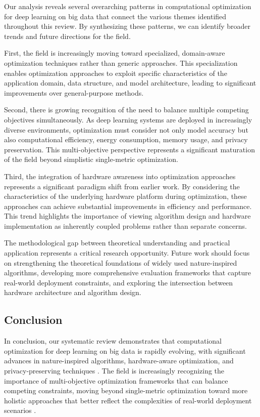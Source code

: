 Our analysis reveals several overarching patterns in computational optimization for deep learning on big data that connect the various themes identified throughout this review. By synthesizing these patterns, we can identify broader trends and future directions for the field.

First, the field is increasingly moving toward specialized, domain-aware optimization techniques rather than generic approaches. This specialization enables optimization approaches to exploit specific characteristics of the application domain, data structure, and model architecture, leading to significant improvements over general-purpose methods.

Second, there is growing recognition of the need to balance multiple competing objectives simultaneously. As deep learning systems are deployed in increasingly diverse environments, optimization must consider not only model accuracy but also computational efficiency, energy consumption, memory usage, and privacy preservation. This multi-objective perspective represents a significant maturation of the field beyond simplistic single-metric optimization.

Third, the integration of hardware awareness into optimization approaches represents a significant paradigm shift from earlier work. By considering the characteristics of the underlying hardware platform during optimization, these approaches can achieve substantial improvements in efficiency and performance. This trend highlights the importance of viewing algorithm design and hardware implementation as inherently coupled problems rather than separate concerns.

The methodological gap between theoretical understanding and practical application represents a critical research opportunity. Future work should focus on strengthening the theoretical foundations of widely used nature-inspired algorithms, developing more comprehensive evaluation frameworks that capture real-world deployment constraints, and exploring the intersection between hardware architecture and algorithm design.

\subsection{Conclusion}
In conclusion, our systematic review demonstrates that computational optimization for deep learning on big data is rapidly evolving, with significant advances in nature-inspired algorithms, hardware-aware optimization, and privacy-preserving techniques \citep{Eid20223845, Kim2022, Zhang20229876}. The field is increasingly recognizing the importance of multi-objective optimization frameworks that can balance competing constraints, moving beyond single-metric optimization toward more holistic approaches that better reflect the complexities of real-world deployment scenarios \citep{Deb2014}.

